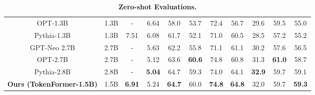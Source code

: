 \begin{frame}
\begin{table}[t]
{\begin{tabular}{cccccccccc|c}
      OPT-1.3B            & 1.3B     &  -   &6.64 & 58.0 & 53.7 & 72.4 & 56.7 & 29.6 & 59.5 & 55.0 \\
      Pythia-1.3B			& 1.3B	   & 7.51 &6.08 & 61.7 & 52.1 & 71.0 & 60.5 &  28.5 &  57.2 & 55.2\\
      GPT-Neo 2.7B            & 2.7B     &  -   &5.63 & 62.2 & 55.8 & 71.1 & 61.1 & 30.2  & 57.6 & 56.5\\
      OPT-2.7B            & 2.7B     &  -   &5.12 & 63.6 & \textbf{60.6} & 74.8 & 60.8 & 31.3 & \textbf{61.0} & 58.7\\
      Pythia-2.8B			& 2.8B	   & - &\textbf{5.04} & 64.7 & 59.3 & 74.0 & 64.1 &  \textbf{32.9} &  59.7 & 59.1\\
      \hline
      \textbf{Ours (TokenFormer-1.5B)}			& 1.5B	   & \textbf{6.91} & 5.24 & \textbf{64.7} & 60.0 & \textbf{74.8} & \textbf{64.8} &  32.0 & 59.7 & \textbf{59.3} \\
      \bottomrule
    \end{tabular}
    } 
      \caption{\textbf{Zero-shot Evaluations.}}
      \label{tab:llm_benchmark}
  \end{table}
\end{frame}

